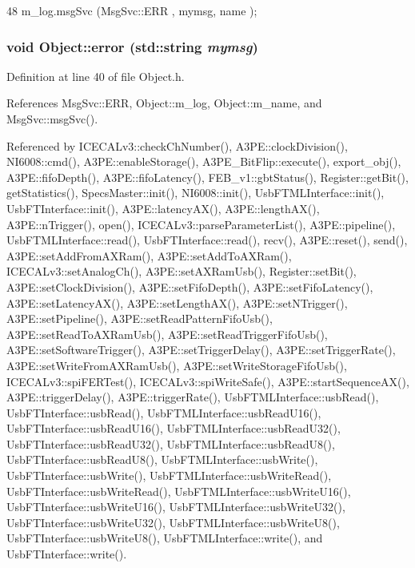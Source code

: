 \begin{DoxyCode}
48 { m_log.msgSvc (MsgSvc::ERR     , mymsg, name ); }
\end{DoxyCode}
\hypertarget{classObject_a204a95f57818c0f811933917a30eff45}{
\subsubsection[{error}]{\setlength{\rightskip}{0pt plus 5cm}void Object::error (std::string {\em mymsg})}}
\label{classObject_a204a95f57818c0f811933917a30eff45}


Definition at line 40 of file Object.h.

References MsgSvc::ERR, Object::m\_\-log, Object::m\_\-name, and MsgSvc::msgSvc().

Referenced by ICECALv3::checkChNumber(), A3PE::clockDivision(), NI6008::cmd(), A3PE::enableStorage(), A3PE\_\-BitFlip::execute(), export\_\-obj(), A3PE::fifoDepth(), A3PE::fifoLatency(), FEB\_\-v1::gbtStatus(), Register::getBit(), getStatistics(), SpecsMaster::init(), NI6008::init(), UsbFTMLInterface::init(), UsbFTInterface::init(), A3PE::latencyAX(), A3PE::lengthAX(), A3PE::nTrigger(), open(), ICECALv3::parseParameterList(), A3PE::pipeline(), UsbFTMLInterface::read(), UsbFTInterface::read(), recv(), A3PE::reset(), send(), A3PE::setAddFromAXRam(), A3PE::setAddToAXRam(), ICECALv3::setAnalogCh(), A3PE::setAXRamUsb(), Register::setBit(), A3PE::setClockDivision(), A3PE::setFifoDepth(), A3PE::setFifoLatency(), A3PE::setLatencyAX(), A3PE::setLengthAX(), A3PE::setNTrigger(), A3PE::setPipeline(), A3PE::setReadPatternFifoUsb(), A3PE::setReadToAXRamUsb(), A3PE::setReadTriggerFifoUsb(), A3PE::setSoftwareTrigger(), A3PE::setTriggerDelay(), A3PE::setTriggerRate(), A3PE::setWriteFromAXRamUsb(), A3PE::setWriteStorageFifoUsb(), ICECALv3::spiFERTest(), ICECALv3::spiWriteSafe(), A3PE::startSequenceAX(), A3PE::triggerDelay(), A3PE::triggerRate(), UsbFTMLInterface::usbRead(), UsbFTInterface::usbRead(), UsbFTMLInterface::usbReadU16(), UsbFTInterface::usbReadU16(), UsbFTMLInterface::usbReadU32(), UsbFTInterface::usbReadU32(), UsbFTMLInterface::usbReadU8(), UsbFTInterface::usbReadU8(), UsbFTMLInterface::usbWrite(), UsbFTInterface::usbWrite(), UsbFTMLInterface::usbWriteRead(), UsbFTInterface::usbWriteRead(), UsbFTMLInterface::usbWriteU16(), UsbFTInterface::usbWriteU16(), UsbFTMLInterface::usbWriteU32(), UsbFTInterface::usbWriteU32(), UsbFTMLInterface::usbWriteU8(), UsbFTInterface::usbWriteU8(), UsbFTMLInterface::write(), and UsbFTInterface::write().


